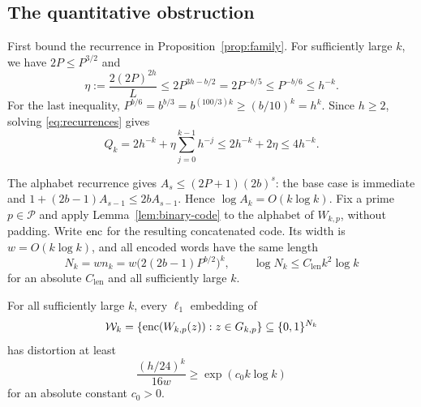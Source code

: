 \subsection{The quantitative obstruction}

First bound the recurrence in Proposition~\ref{prop:family}. For
sufficiently large $k$, we have $2P\le P^{3/2}$ and
\[
 \eta:=\frac{2(2P)^{2h}}L
 \le2P^{3h-b/2}=2P^{-b/5}
 \le P^{-b/6}\le h^{-k}.
\]
For the last inequality,
$P^{b/6}=b^{b/3}=b^{(100/3)k}\ge(b/10)^k=h^k$.
Since $h\ge2$, solving \eqref{eq:recurrences} gives
\begin{equation}\label{eq:Q-small}
 Q_k=2h^{-k}+\eta\sum_{j=0}^{k-1}h^{-j}
 \le2h^{-k}+2\eta\le4h^{-k}.
\end{equation}

The alphabet recurrence gives
$A_s\le(2P+1)(2b)^s$: the base case is immediate and
$1+(2b-1)A_{s-1}\le2bA_{s-1}$. Hence
$\log A_k=O(k\log k)$. Fix a prime $p\in\mathcal P$ and apply
Lemma~\ref{lem:binary-code} to the alphabet of $W_{k,p}$, without
padding. Write $\operatorname{enc}$ for the resulting concatenated code. Its width
is $w=O(k\log k)$, and all encoded words have the same length
\begin{equation}\label{eq:encoded-length}
 N_k=wn_k=w\bigl(2(2b-1)P^{b/2}\bigr)^k,
 \qquad
 \log N_k\le C_{\mathrm{len}}k^2\log k
\end{equation}
for an absolute $C_{\mathrm{len}}$ and all sufficiently large $k$.

\begin{proposition}\label{prop:binary-lower}
For all sufficiently large $k$, every $\ell_1$ embedding of
\[
 \mathcal W_k=\{\operatorname{enc}(W_{k,p}(z)):z\in G_{k,p}\}
 \subseteq\{0,1\}^{N_k}
\]
has distortion at least
\begin{equation}\label{eq:distortion-k}
 \frac{(h/24)^k}{16w}\ge\exp(c_0k\log k)
\end{equation}
for an absolute constant $c_0>0$.
\end{proposition}

